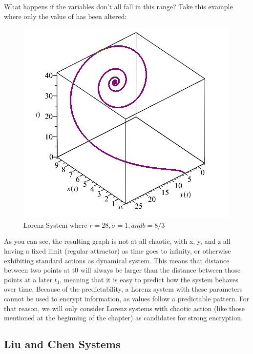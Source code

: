 \par What happens if the variables don't all fall in this range?  Take this example where only the value of \textsigma has been altered:
%
\begin{figure}[H]
    \centering
	\includegraphics[width=\linewidth]{lorenz_s2.png}
	\caption{Lorenz System where $r = 28, \sigma = 1, and b = 8/3$}
	\label{fig:badLorenz}
\end{figure}
%
As you can see, the resulting graph is not at all chaotic, with x, y, and z all having a fixed limit (regular attractor) as time goes to infinity, or otherwise exhibiting standard actions as dynamical system.  This means that distance between two points at t0 will always be larger than the distance between those points at a later $t_1$, meaning that it is easy to predict how the system behaves over time.  Because of the predictability, a Lorenz system with these parameters cannot be used to encrypt information, as values follow a predictable pattern.  For that reason, we will only consider Lorenz systems with chaotic action (like those mentioned at the beginning of the chapter) as candidates for strong encryption.

%
\subsection{Liu and Chen Systems}

